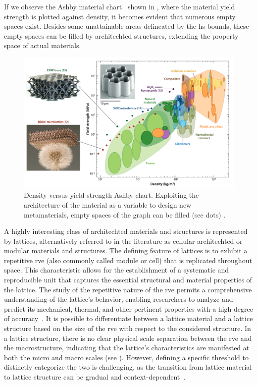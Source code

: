 If we observe the Ashby material chart~ shown in , where the material yield strength is plotted against density, it becomes evident that numerous empty spaces exist. Besides some unattainable areas delineated  by the \gls{hs} bounds, these empty spaces can be filled by architechted structures, extending the property space of actual materials.
\begin{figure}
    \centering
    \includegraphics[width=\linewidth]{figures/02_literature/ashby_chart.png}
    \caption{Density versus yield strength Ashby chart. Exploiting the architecture of the material as a variable to design new metamaterials, empty spaces of the graph can be filled (see dots) \cite{schaedler_architected_2016}.}
    \label{fig:02_ashby_ch}
\end{figure}

A highly interesting class of architechted materials and structures is represented by lattices, alternatively referred to in the literature as cellular architechted or modular materials and structures. The defining feature of lattices is to exhibit a repetitive \gls{rve} (also commonly called module or cell) that is replicated throughout space. This characteristic allows for the establishment of a systematic and reproducible unit that captures the essential structural and material properties of the lattice. The study of the repetitive nature of the \gls{rve} permits a comprehensive understanding of the lattice's behavior, enabling researchers to analyze and predict its mechanical, thermal, and other pertinent properties with a high degree of accuracy~. It is possible to differentiate between a lattice material and a lattice structure based on the size of the \gls{rve} with respect to the considered structure. In a lattice structure, there is no clear physical scale separation between the \gls{rve} and the macrostructure, indicating that the lattice's characteristics are manifested at both the micro and macro scales (see ). However, defining a specific threshold to distinctly categorize the two is challenging, as the transition from lattice material to lattice structure can be gradual and context-dependent~.

